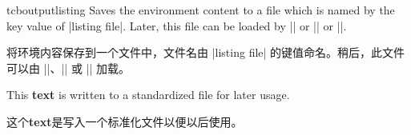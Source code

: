
\begin{docEnvironment}{tcboutputlisting}{}
Saves the environment content to a file which is named by the key value of
|listing file|. Later, this file can be loaded by
|\tcbinputlisting| or |\tcbuselistingtext| or |\tcbuselistinglisting|.

将环境内容保存到一个文件中，文件名由 |listing file| 的键值命名。稍后，此文件可以由 |\tcbinputlisting|、|\tcbuselistingtext| 或 |\tcbuselistinglisting| 加载。
\begin{dispListing}
\begin{tcboutputlisting}
This \textbf{text} is written to a standardized file for later usage.

这个\textbf{text}是写入一个标准化文件以便以后使用。
\end{tcboutputlisting}
\end{dispListing}
\end{docEnvironment}


